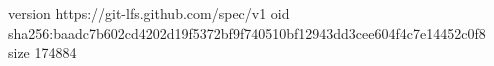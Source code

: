 version https://git-lfs.github.com/spec/v1
oid sha256:baadc7b602cd4202d19f5372bf9f740510bf12943dd3cee604f4c7e14452c0f8
size 174884
